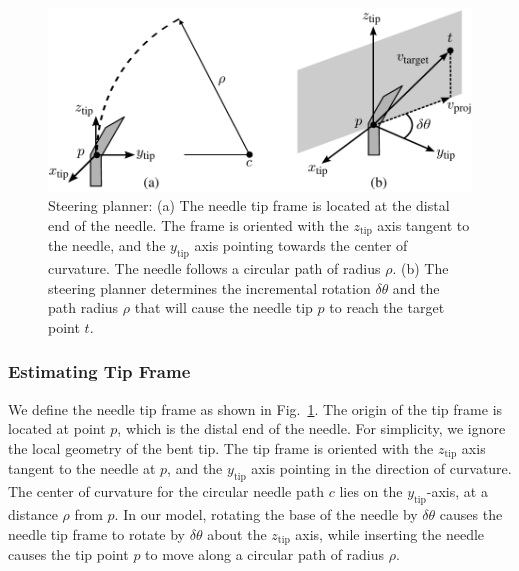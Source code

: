 \begin{figure}[!t]
\centering
\includegraphics[width = 0.75\columnwidth]{Images/Chapter2/ControlAlgorithm/ControlAlgorithm}%
\caption[Steering planner]{Steering planner: (a) The needle tip frame is located at the distal end of the needle. The frame is oriented with the $z_{\text{tip}}$ axis tangent to the needle, and the $y_{\text{tip}}$ axis pointing towards the center of curvature. The needle follows a circular path of radius $\rho$. (b) The steering planner determines the incremental rotation $\delta\theta$ and the path radius $\rho$ that will cause the needle tip $p$ to reach the target point ${t}$.  }
\label{fig:ControlAlgorithm}
\end{figure}

\subsubsection{Estimating Tip Frame}
We define the needle tip frame as shown in Fig.~\ref{fig:ControlAlgorithm}. The origin of the tip frame is located at point ${p}$, which is the distal end of the needle. For simplicity, we ignore the local geometry of the bent tip. The tip frame is oriented with the $z_{\text{tip}}$ axis tangent to the needle at ${p}$, and the $y_{\text{tip}}$ axis pointing in the direction of curvature. The center of curvature for the circular needle path ${c}$ lies on the $y_{\text{tip}}$-axis, at a distance $\rho$ from ${p}$. In our model, rotating the base of the needle by $\delta\theta$ causes the needle tip frame to rotate by $\delta\theta$ about the $z_{\text{tip}}$ axis, while inserting the needle causes the tip point ${p}$ to move along  a circular path of radius $\rho$.

